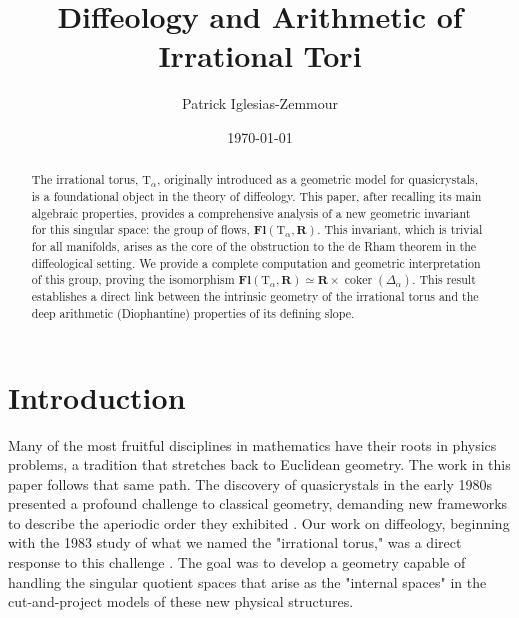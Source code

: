 \documentclass[10pt,letterpaper,reqno]{amsart}
\title{Diffeology and Arithmetic of Irrational Tori}
\author{Patrick Iglesias-Zemmour}
\date{\today}
\theoremstyle{article}
\newcommand{\1}{{\hat 1}}
\newcommand{\0}{{\hat 0}}
\newcommand{\RR}{\mathbf R}
\def \T{\mathrm T}
\newcommand{\coker}{\operatorname{coker}}
\DeclareMathOperator{\Fb}{\boldsymbol{\mathsf{Fl}}}
\renewcommand{\Fb}{\mathbf{Fl}}
\begin{document}
  
  \maketitle
  
  
  {
  }

  
  \begin{abstract}
    The irrational torus,
    $\T_\alpha$,
    originally introduced as a geometric model for quasicrystals,
    is a foundational object in the theory of diffeology.
    This paper,
    after recalling its main algebraic properties,
    provides a comprehensive analysis of a new geometric invariant for this singular space:
    the group of flows, $\Fb(\T_\alpha, \RR)$.
    This invariant, which is trivial for all manifolds,
    arises as the core of the obstruction to the de Rham theorem in the diffeological setting.
    We provide a complete computation and geometric interpretation of this group,
    proving the isomorphism $\Fb(\T_\alpha, \RR) \simeq \RR \times \coker(\Delta_\alpha)$.
    This result establishes a direct link between the intrinsic geometry of the irrational torus and the deep arithmetic (Diophantine) properties of its defining slope.
  \end{abstract}
  
  
  \section*{Introduction}
  
  Many of the most fruitful disciplines in mathematics have their roots in physics problems,
  a tradition that stretches back to Euclidean geometry.
  The work in this paper follows that same path.
  The discovery of quasicrystals in the early 1980s presented a profound challenge to classical geometry,
  demanding new frameworks to describe the aperiodic order they exhibited \cite{She84}.
  Our work on diffeology,
  beginning with the 1983 study of what we named the "irrational torus,"
  was a direct response to this challenge \cite{DIZ83}.
  The goal was to develop a geometry capable of handling the singular quotient spaces that arise as the "internal spaces" in the cut-and-project models of these new physical structures.
  
\end{document}

